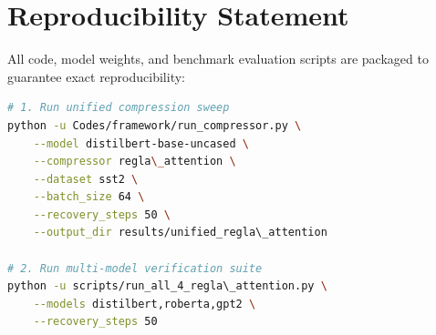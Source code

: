 \section{Reproducibility Statement}
All code, model weights, and benchmark evaluation scripts are packaged to guarantee exact reproducibility:
\begin{lstlisting}[language=bash]
# 1. Run unified compression sweep
python -u Codes/framework/run_compressor.py \
    --model distilbert-base-uncased \
    --compressor regla\_attention \
    --dataset sst2 \
    --batch_size 64 \
    --recovery_steps 50 \
    --output_dir results/unified_regla\_attention

# 2. Run multi-model verification suite
python -u scripts/run_all_4_regla\_attention.py \
    --models distilbert,roberta,gpt2 \
    --recovery_steps 50
\end{lstlisting}
